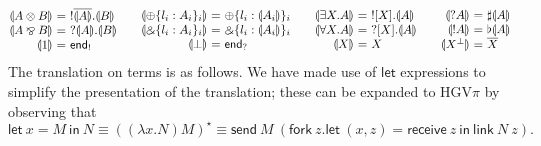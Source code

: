 \documentclass{easychair}
\makeatletter
\newcommand{\ba}{\begin{array}}
\newcommand{\ea}{\end{array}}
\newenvironment{eqs}{\ba{@{}r@{~}c@{~}l@{}}}{\ea}
\newcommand{\key}{\mathsf}
\newcommand{\set}[1]{\{ #1 \}}
\newcommand{\cptogv}[1]{\llparenthesis{#1}\rrparenthesis}
\newcommand{\row}[2]{\set{#1}_{#2}}
\newcommand{\gvOutput}[2]{\mathord{!}{#1}.{#2}}
\newcommand{\gvInput}[2]{\mathord{?}{#1}.{#2}}
\newcommand{\gvEndOutput}{\key{end}_!}
\newcommand{\gvEndInput}{\key{end}_?}
\newcommand{\gvPlus}[2]{\oplus \row{#1}{#2}}
\newcommand{\gvChoice}[2]{\binampersand \row{#1}{#2}}
\newcommand{\gvServer}[1]{\flat {#1}}
\newcommand{\gvService}[1]{\sharp {#1}}
\newcommand{\gvDual}[1]{\overline{#1}}
\newcommand{\gvOutputType}[2]{![{#1}].{#2}}
\newcommand{\gvInputType}[2]{?[{#1}].{#2}}
\newcommand{\la}{l}
\newcommand{\gvLink}[2]{\key{link}~{#1}~{#2}}
\newcommand{\gvPair}[2]{({#1},{#2})}
\newcommand{\gvLet}[3]{\key{let}~{#1}={#2}~\key{in}~{#3}}
\newcommand{\gvSend}[2]{\key{send}~{#1}~{#2}}
\newcommand{\gvReceive}[1]{\key{receive}~{#1}}
\newcommand{\gvFork}[2]{\key{fork}~{#1}.{#2}}
\newcommand{\gvReceiveK}[4]{\gvLet{\gvPair{#1}{#2}}{\gvReceive{#3}}{#4}}
\newcommand{\cpTimes}[2]{{#1} \otimes {#2}}
\newcommand{\cpPar}[2]{{#1} \mathbin{\bindnasrepma} {#2}}
\newcommand{\cpPlus}[2]{\oplus \row{#1}{#2}}
\newcommand{\cpWith}[2]{\binampersand \row{#1}{#2}}
\newcommand{\cpOne}{1}
\newcommand{\cpBottom}{\bot}
\newcommand{\cpOfCourse}[1]{\mathord{!}{#1}}
\newcommand{\cpWhyNot}[1]{\mathord{?}{#1}}
\newcommand{\cpDual}[1]{{#1}^\bot}
\newcommand{\cpExists}[2]{\exists {#1}.{#2}}
\newcommand{\cpForall}[2]{\forall {#1}.{#2}}
\newcommand{\hgvpi}{HGV$\pi$\xspace}
\newcommand{\lampi}[1]{({#1})^\star}
\makeatother
\begin{document}
\[
\ba{@{}c@{\qquad}c@{\qquad}c@{\qquad}c@{}}
\begin{eqs}
\cptogv{\cpTimes{A}{B}} &=& \gvOutput{\gvDual{\cptogv{A}}}{\cptogv{B}} \\
\cptogv{\cpPar{A}{B}}   &=& \gvInput{\cptogv{A}}{\cptogv{B}} \\
\cptogv{\cpOne}         &=& \gvEndOutput \\
\end{eqs}
&
\begin{eqs}
\cptogv{\cpPlus{\la_i:A_i}{i}} &=& \gvPlus{\la_i:\cptogv{A_i}}{i}  \\
\cptogv{\cpWith{\la_i:A_i}{i}} &=& \gvChoice{\la_i:\cptogv{A_i}}{i} \\
\cptogv{\cpBottom}      &=& \gvEndInput \\
\end{eqs}
&
\begin{eqs}
\cptogv{\cpExists{X}{A}} &=& \gvOutputType{X}{\cptogv{A}} \\
\cptogv{\cpForall{X}{A}} &=& \gvInputType{X}{\cptogv{A}} \\
\cptogv{X}               &=& X \\
\end{eqs}
&
\begin{eqs}
\cptogv{\cpWhyNot{A}}    &=& \gvService{\cptogv{A}} \\
\cptogv{\cpOfCourse{A}}  &=& \gvServer{\cptogv{A}} \\
\cptogv{\cpDual{X}}      &=& \gvDual{X} \\
\end{eqs}
\ea
\]
The translation on terms is as follows.  We have made use of $\key{let}$ expressions to simplify the
presentation of the translation; these can be expanded to \hgvpi by observing that
\[
\gvLet{x}{M}{N} \equiv \lampi{(\lambda x.N) M} \equiv \gvSend{M}{(\gvFork{z}{\gvReceiveK{x}{z}{z}{\gvLink{N}{z}}})}.
\]
\end{document}
